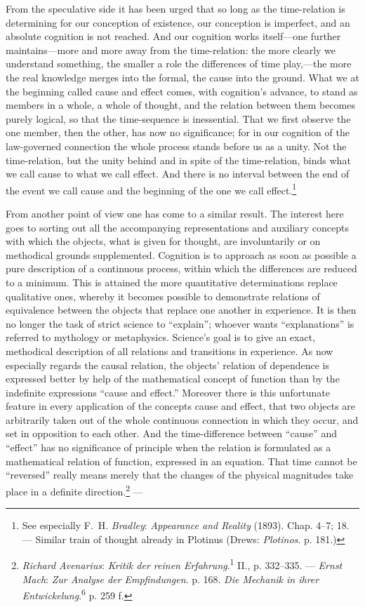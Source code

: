 \documentclass[12pt,a4paper]{book}
\newcommand{\opage}[1]{\marginnote{\footnotesize\textit{[#1]}}}
\begin{document}
From the speculative side it has been urged that so long as the \opage{283}time-relation is
determining for our conception of existence, our conception is imperfect, and an
absolute cognition is not reached. And our cognition works itself---one further
maintains---more and more away from the time-relation: the more clearly we
understand something, the smaller a role the differences of time play,---the
more the real knowledge merges into the formal, the cause into the ground. What
we at the beginning called cause and effect comes, with cognition's advance, to
stand as members in a whole, a whole of thought, and the relation between them
becomes purely logical, so that the time-sequence is inessential. That we first
observe the one member, then the other, has now no significance; for in our
cognition of the law-governed connection the whole process stands before us as a
unity. Not the time-relation, but the unity behind and in spite of the
time-relation, binds what we call cause to what we call effect. And there is no
interval between the end of the event we call cause and the beginning of the one
we call effect.\footnote{See especially F.\ H. \emph{Bradley}: \emph{Appearance
and Reality} (1893). Chap. 4--7; 18. --- Similar train of thought already in
Plotinus (Drews: \emph{Plotinos}. p. 181.)}

From another point of view one has come to a similar result. The interest here
goes to sorting out all the accompanying representations and auxiliary concepts
with which the objects, what is given for thought, are involuntarily or on
methodical grounds supplemented. Cognition is to approach as soon as possible a
pure description of a continuous process, within which the differences are
reduced to a minimum. This is attained the more quantitative determinations
replace qualitative ones, whereby it becomes possible to demonstrate relations
of equivalence between the objects that replace one another in experience. It is
then no longer the task of strict science to ``explain''; whoever wants
``explanations'' is referred to mythology or metaphysics. Science's goal is to
give an exact, methodical description of all relations and transitions in
experience. As now especially regards the causal relation, the objects'
relation of dependence is expressed better by help of the mathematical concept
of function than by \opage{284}the indefinite expressions ``cause and effect.'' Moreover
there is this unfortunate feature in every application of the concepts cause and
effect, that two objects are arbitrarily taken out of the whole continuous
connection in which they occur, and set in opposition to each other. And the
time-difference between ``cause'' and ``effect'' has no significance of
principle when the relation is formulated as a mathematical relation of
function, expressed in an equation. That time cannot be ``reversed'' really
means merely that the changes of the physical magnitudes take place in a
definite direction.\footnote{\emph{Richard Avenarius}: \emph{Kritik der reinen
Erfahrung}.\textsuperscript{1} II., p. 332--335. --- \emph{Ernst Mach}: \emph{Zur
Analyse der Empfindungen}. p. 168. \emph{Die Mechanik in ihrer
Entwickelung}.\textsuperscript{6} p. 259 f.} ---
\end{document}
